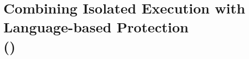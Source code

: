 
\chapter{Combining Isolated Execution with Language-based Protection \\ ({\em \systemname{}})}











